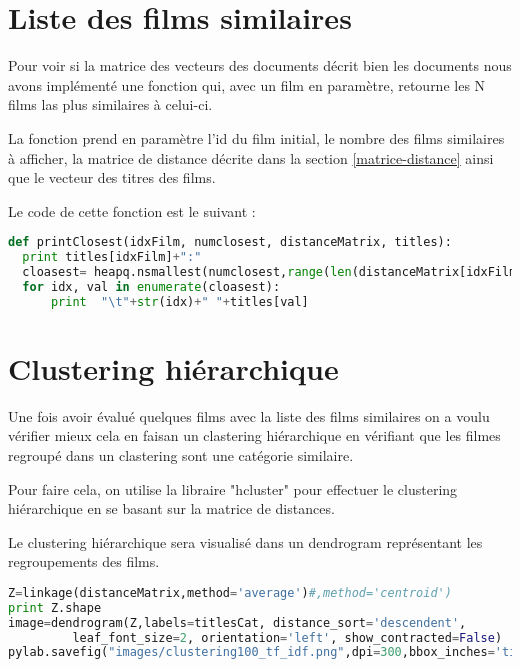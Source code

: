 \section{Liste des films similaires}

Pour voir si la matrice des vecteurs des documents décrit bien les documents nous avons implémenté une fonction qui, avec un film en paramètre, retourne les N films las plus similaires à celui-ci.

La fonction prend en paramètre l'id du film initial, le nombre des films similaires à afficher, la matrice de distance décrite dans la section \ref{matrice-distance} ainsi que le vecteur des titres des films.

Le code de cette fonction est le suivant : \\

\begin{lstlisting}[language=python]
def printClosest(idxFilm, numclosest, distanceMatrix, titles):
  print titles[idxFilm]+":"
  cloasest= heapq.nsmallest(numclosest,range(len(distanceMatrix[idxFilm])),distanceMatrix[idxFilm].take)
  for idx, val in enumerate(cloasest):
      print  "\t"+str(idx)+" "+titles[val]
\end{lstlisting}


\section{Clustering hiérarchique}

Une fois avoir évalué quelques films avec la liste des films similaires on a voulu vérifier mieux cela en faisan un clastering hiérarchique en vérifiant que les filmes regroupé dans un clastering sont une catégorie similaire.

Pour faire cela, on utilise la libraire "hcluster" pour effectuer le clustering hiérarchique en se basant sur la matrice de distances.

Le clustering hiérarchique sera visualisé dans un dendrogram représentant les regroupements des films. \\

\begin{lstlisting}[language=python]
Z=linkage(distanceMatrix,method='average')#,method='centroid')
print Z.shape
image=dendrogram(Z,labels=titlesCat, distance_sort='descendent',
         leaf_font_size=2, orientation='left', show_contracted=False)
pylab.savefig("images/clustering100_tf_idf.png",dpi=300,bbox_inches='tight')	 	  
\end{lstlisting}

